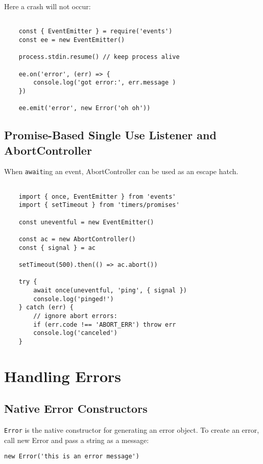 \documentclass{scrartcl}
\begin{document}
Here a crash will not occur:

\begin{lstlisting}[style=ES6]

    const { EventEmitter } = require('events')
    const ee = new EventEmitter()

    process.stdin.resume() // keep process alive

    ee.on('error', (err) => {
        console.log('got error:', err.message )
    })

    ee.emit('error', new Error('oh oh'))

\end{lstlisting}

\subsection{Promise-Based Single Use Listener and AbortController}

When \lstinline|await|ing an event, AbortController can be used as an escape hatch.

\begin{lstlisting}[style=ES6]

    import { once, EventEmitter } from 'events'
    import { setTimeout } from 'timers/promises'

    const uneventful = new EventEmitter()

    const ac = new AbortController()
    const { signal } = ac

    setTimeout(500).then(() => ac.abort())

    try {
        await once(uneventful, 'ping', { signal })
        console.log('pinged!')
    } catch (err) {
        // ignore abort errors:
        if (err.code !== 'ABORT_ERR') throw err
        console.log('canceled')
    }

\end{lstlisting}

\section{Handling Errors}
\subsection{Native Error Constructors}

\lstinline|Error| is the native constructor for generating an error object. To create an error, call new Error and pass a string as a message:

\begin{lstlisting}[style=ES6]
    new Error('this is an error message')
\end{lstlisting}
\end{document}
